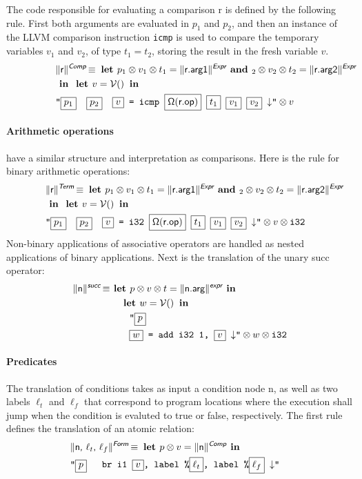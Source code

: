 \documentclass{llncs}
\newcommand{\trad}[2]{\ensuremath{\lVert \textsf{#1} \rVert^{\textit{#2}}}}
\newcommand{\nl}[0]{\ensuremath{\downarrow}}
\DeclareMathOperator{\isdef}{\equiv}
\DeclareMathOperator{\variable}{\mathcal{V}()}
\newcommand{\llvm}[1]{\texttt{#1}}
\newcommand{\B}[1]{\textsf{#1}}
\newcommand{\LET}[0]{\textbf{ let }}
\newcommand{\IN}[0]{\textbf{ in }}
\newcommand{\AND}[1]{\textbf{ and }}
\newcommand{\PH}[1]{\framebox{$#1$}}
\newcommand{\sep}[0]{\otimes}
\newcommand{\opmap}[0]{\ensuremath{\sf\Omega}}
\begin{document}
The code responsible for evaluating a comparison \B{r} is defined by the
following rule. First both arguments are evaluated in $p_1$ and $p_2$, and then
an instance of the LLVM comparison instruction \llvm{icmp} is used to compare
the temporary variables $v_1$ and $v_2$, of type $t_1 = t_2$, storing the result
in the fresh variable $v$.
\begin{align*}
\lefteqn{\trad{r}{\B{Comp}} \isdef
  \LET
  p_1 \sep v_1 \sep t_1 = \trad{r.arg1}{\B{Expr}} \AND
  p_2 \sep v_2 \sep t_2 = \trad{r.arg2}{\B{Expr}}} \\
& \IN \LET v = \variable \IN \\
& \llvm{"\PH{p_1}\quad\PH{p_2}\quad\PH{v} = icmp \PH{\opmap(\B{r.op})} \PH{t_1} \PH{v_1} \PH{v_2} \nl"} \sep v
\end{align*}

\paragraph{Arithmetic operations} have a similar
structure and interpretation as comparisons. Here is the rule for binary
arithmetic operations:
\begin{align*}
\lefteqn{\trad{r}{\B{Term}} \isdef
  \LET
  p_1 \sep v_1 \sep t_1 = \trad{r.arg1}{\B{Expr}} \AND
  p_2 \sep v_2 \sep t_2 = \trad{r.arg2}{\B{Expr}}} \\
& \IN \LET v = \variable \IN \\
& \llvm{"\PH{p_1}\quad\PH{p_2}\quad\PH{v} = i32 \PH{\opmap(\B{r.op})} \PH{t_1} \PH{v_1} \PH{v_2} \nl"} \sep v \sep \llvm{i32}
\end{align*}
Non-binary applications of associative operators are handled as nested
applications of binary applications. Next is the translation of the unary
\B{succ} operator:
\begin{align*}
  \trad{n}{\B{succ}} \isdef & \textbf{ let } p \sep v \sep t = \trad{n.arg}{\B{expr}} \IN  \\
  & \quad \LET w = \variable \IN \\
  & \quad \quad \llvm{"\PH{p}} \\
  & \quad \quad \llvm{\PH{w} = add i32 1, \PH{v} \nl"} \sep w \sep \llvm{i32}
\end{align*}

\paragraph{Predicates}
The translation of conditions takes as input a condition node \B{n}, as well as
two labels $\ell_t$ and $\ell_f$ that correspond to program locations where the
execution shall jump when the condition is evaluted to true or false,
respectively.  The first rule defines the translation of an atomic relation:
\begin{align*}
  \lefteqn{\trad{n, $\ell_t$, $\ell_f$}{\B{Form}} \isdef
  \textbf{ let } p \sep v = \trad{n}{\B{Comp}} \IN} \\
  & \llvm{"\PH{p} \quad br i1 \PH{v}, label \%\PH{\ell_t}, label \%\PH{\ell_f} \nl"}
\end{align*}
\end{document}
